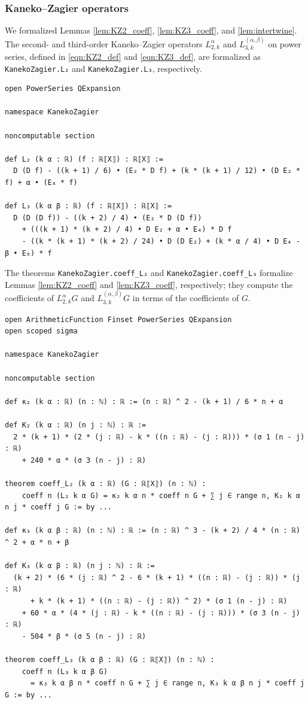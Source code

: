 \documentclass[10pt,reqno]{amsproc}
\newcommand{\1}{\mathds{1}}	%
\theoremstyle{definition}
\theoremstyle{remark}
\begin{document}
\subsubsection{Kaneko--Zagier operators}

We formalized Lemmas \ref{lem:KZ2_coeff}, \ref{lem:KZ3_coeff}, and \ref{lem:intertwine}.
The second- and third-order Kaneko--Zagier operators $L_{2,k}^{\alpha}$ and $L_{3,k}^{(\alpha,\beta)}$ on power series, defined in \eqref{eqn:KZ2_def} and \eqref{eqn:KZ3_def}, are formalized as \lstinline|KanekoZagier.L₂| and \lstinline|KanekoZagier.L₃|, respectively.

\begin{lstlisting}[language=lean]
open PowerSeries QExpansion

namespace KanekoZagier

noncomputable section

def L₂ (k α : ℝ) (f : ℝ⟦X⟧) : ℝ⟦X⟧ :=
  D (D f) - ((k + 1) / 6) • (E₂ * D f) + (k * (k + 1) / 12) • (D E₂ * f) + α • (E₄ * f)

def L₃ (k α β : ℝ) (f : ℝ⟦X⟧) : ℝ⟦X⟧ :=
  D (D (D f)) - ((k + 2) / 4) • (E₂ * D (D f))
    + (((k + 1) * (k + 2) / 4) • D E₂ + α • E₄) * D f
    - ((k * (k + 1) * (k + 2) / 24) • D (D E₂) + (k * α / 4) • D E₄ - β • E₆) * f
\end{lstlisting}

The theorems \lstinline|KanekoZagier.coeff_L₂| and \lstinline|KanekoZagier.coeff_L₃| formalize Lemmas \ref{lem:KZ2_coeff} and \ref{lem:KZ3_coeff}, respectively; they compute the coefficients of $L_{2,k}^{\alpha}G$ and $L_{3,k}^{(\alpha,\beta)}G$ in terms of the coefficients of $G$.

\begin{lstlisting}[language=lean]
open ArithmeticFunction Finset PowerSeries QExpansion
open scoped sigma

namespace KanekoZagier

noncomputable section

def κ₂ (k α : ℝ) (n : ℕ) : ℝ := (n : ℝ) ^ 2 - (k + 1) / 6 * n + α

def K₂ (k α : ℝ) (n j : ℕ) : ℝ :=
  2 * (k + 1) * (2 * (j : ℝ) - k * ((n : ℝ) - (j : ℝ))) * (σ 1 (n - j) : ℝ)
    + 240 * α * (σ 3 (n - j) : ℝ)

theorem coeff_L₂ (k α : ℝ) (G : ℝ⟦X⟧) (n : ℕ) :
    coeff n (L₂ k α G) = κ₂ k α n * coeff n G + ∑ j ∈ range n, K₂ k α n j * coeff j G := by ...

def κ₃ (k α β : ℝ) (n : ℕ) : ℝ := (n : ℝ) ^ 3 - (k + 2) / 4 * (n : ℝ) ^ 2 + α * n + β

def K₃ (k α β : ℝ) (n j : ℕ) : ℝ :=
  (k + 2) * (6 * (j : ℝ) ^ 2 - 6 * (k + 1) * ((n : ℝ) - (j : ℝ)) * (j : ℝ)
      + k * (k + 1) * ((n : ℝ) - (j : ℝ)) ^ 2) * (σ 1 (n - j) : ℝ)
    + 60 * α * (4 * (j : ℝ) - k * ((n : ℝ) - (j : ℝ))) * (σ 3 (n - j) : ℝ)
    - 504 * β * (σ 5 (n - j) : ℝ)

theorem coeff_L₃ (k α β : ℝ) (G : ℝ⟦X⟧) (n : ℕ) :
    coeff n (L₃ k α β G)
      = κ₃ k α β n * coeff n G + ∑ j ∈ range n, K₃ k α β n j * coeff j G := by ...
\end{lstlisting}
\end{document}
